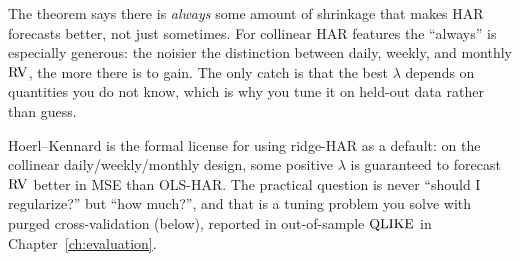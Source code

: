 \begin{intuition}
The theorem says there is \emph{always} some amount of shrinkage that makes HAR forecasts better, not just sometimes.
For collinear HAR features the ``always'' is especially generous: the noisier the distinction between daily, weekly, and monthly $\operatorname{RV}$, the more there is to gain.
The only catch is that the best $\lambda$ depends on quantities you do not know, which is why you tune it on held-out data rather than guess.
\end{intuition}

\begin{projectconnection}
Hoerl--Kennard is the formal license for using ridge-HAR as a default: on the collinear daily/weekly/monthly design, some positive $\lambda$ is guaranteed to forecast $\operatorname{RV}$ better in MSE than OLS-HAR.
The practical question is never ``should I regularize?'' but ``how much?'', and that is a tuning problem you solve with purged cross-validation (below), reported in out-of-sample $\operatorname{QLIKE}$ in Chapter~\ref{ch:evaluation}.
\end{projectconnection}

